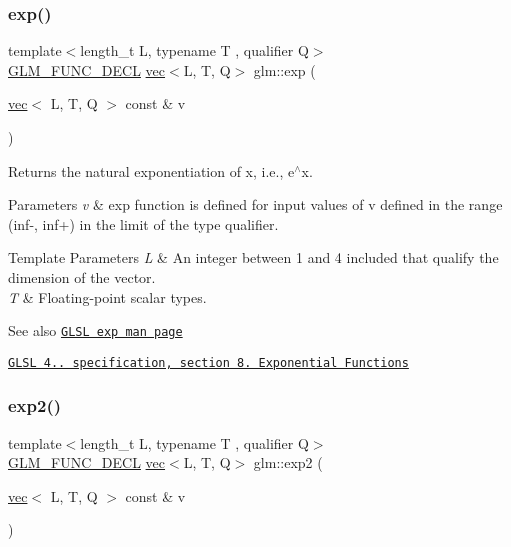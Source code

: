 \subsubsection{\texorpdfstring{exp()}{exp()}}
{\footnotesize\ttfamily template$<$length\+\_\+t L, typename T , qualifier Q$>$ \\
\hyperlink{setup_8hpp_ab2d052de21a70539923e9bcbf6e83a51}{G\+L\+M\+\_\+\+F\+U\+N\+C\+\_\+\+D\+E\+CL} \hyperlink{structglm_1_1vec}{vec}$<$L, T, Q$>$ glm\+::exp (\begin{DoxyParamCaption}\item[{\hyperlink{structglm_1_1vec}{vec}$<$ L, T, Q $>$ const \&}]{v }\end{DoxyParamCaption})}

Returns the natural exponentiation of x, i.\+e., e$^\wedge$x.


\begin{DoxyParams}{Parameters}
{\em v} & exp function is defined for input values of v defined in the range (inf-\/, inf+) in the limit of the type qualifier. \\
\hline
\end{DoxyParams}

\begin{DoxyTemplParams}{Template Parameters}
{\em L} & An integer between 1 and 4 included that qualify the dimension of the vector. \\
\hline
{\em T} & Floating-\/point scalar types.\\
\hline
\end{DoxyTemplParams}
\begin{DoxySeeAlso}{See also}
\href{http://www.opengl.org/sdk/docs/manglsl/xhtml/exp.xml}{\tt G\+L\+SL exp man page} 

\href{http://www.opengl.org/registry/doc/GLSLangSpec.4.20.8.pdf}{\tt G\+L\+SL 4.. specification, section 8. Exponential Functions} 
\end{DoxySeeAlso}
\mbox{\label{group__core__func__exponential_gaff17ace6b579a03bf223ed4d1ed2cd16}} 
\subsubsection{\texorpdfstring{exp2()}{exp2()}}
{\footnotesize\ttfamily template$<$length\+\_\+t L, typename T , qualifier Q$>$ \\
\hyperlink{setup_8hpp_ab2d052de21a70539923e9bcbf6e83a51}{G\+L\+M\+\_\+\+F\+U\+N\+C\+\_\+\+D\+E\+CL} \hyperlink{structglm_1_1vec}{vec}$<$L, T, Q$>$ glm\+::exp2 (\begin{DoxyParamCaption}\item[{\hyperlink{structglm_1_1vec}{vec}$<$ L, T, Q $>$ const \&}]{v }\end{DoxyParamCaption})}


